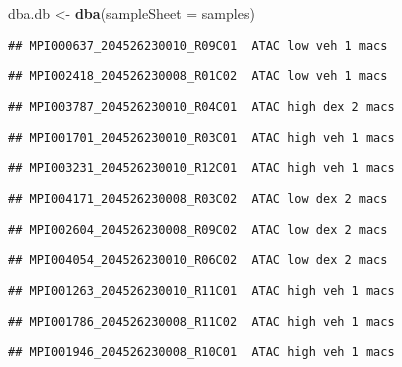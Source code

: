 \documentclass[
]{article}
\newenvironment{Shaded}{\begin{snugshade}}{\end{snugshade}}
\newcommand{\DataTypeTok}[1]{\textcolor[rgb]{0.13,0.29,0.53}{#1}}
\newcommand{\KeywordTok}[1]{\textcolor[rgb]{0.13,0.29,0.53}{\textbf{#1}}}
\newcommand{\NormalTok}[1]{#1}
\newcommand{\StringTok}[1]{\textcolor[rgb]{0.31,0.60,0.02}{#1}}
\begin{document}
\begin{Shaded}
\begin{Highlighting}[]
\NormalTok{dba.db <-}\StringTok{ }\KeywordTok{dba}\NormalTok{(}\DataTypeTok{sampleSheet =}\NormalTok{ samples)}
\end{Highlighting}
\end{Shaded}

\begin{verbatim}
## MPI000637_204526230010_R09C01  ATAC low veh 1 macs
\end{verbatim}

\begin{verbatim}
## MPI002418_204526230008_R01C02  ATAC low veh 1 macs
\end{verbatim}

\begin{verbatim}
## MPI003787_204526230010_R04C01  ATAC high dex 2 macs
\end{verbatim}

\begin{verbatim}
## MPI001701_204526230010_R03C01  ATAC high veh 1 macs
\end{verbatim}

\begin{verbatim}
## MPI003231_204526230010_R12C01  ATAC high veh 1 macs
\end{verbatim}

\begin{verbatim}
## MPI004171_204526230008_R03C02  ATAC low dex 2 macs
\end{verbatim}

\begin{verbatim}
## MPI002604_204526230008_R09C02  ATAC low dex 2 macs
\end{verbatim}

\begin{verbatim}
## MPI004054_204526230010_R06C02  ATAC low dex 2 macs
\end{verbatim}

\begin{verbatim}
## MPI001263_204526230010_R11C01  ATAC high veh 1 macs
\end{verbatim}

\begin{verbatim}
## MPI001786_204526230008_R11C02  ATAC high veh 1 macs
\end{verbatim}

\begin{verbatim}
## MPI001946_204526230008_R10C01  ATAC high veh 1 macs
\end{verbatim}
\end{document}
